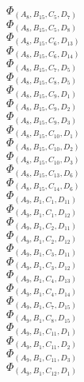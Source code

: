 \documentclass[14pt]{article}
\begin{document}
    $\Phi_{({A}_{8}, {B}_{15}, {C}_{5}, {D}_{7})}$ \\ 
    $\Phi_{({A}_{8}, {B}_{15}, {C}_{5}, {D}_{8})}$ \\ 
    $\Phi_{({A}_{8}, {B}_{15}, {C}_{6}, {D}_{13})}$ \\ 
    $\Phi_{({A}_{8}, {B}_{15}, {C}_{6}, {D}_{14})}$ \\ 
    $\Phi_{({A}_{8}, {B}_{15}, {C}_{7}, {D}_{5})}$ \\ 
    $\Phi_{({A}_{8}, {B}_{15}, {C}_{8}, {D}_{5})}$ \\ 
    $\Phi_{({A}_{8}, {B}_{15}, {C}_{9}, {D}_{1})}$ \\ 
    $\Phi_{({A}_{8}, {B}_{15}, {C}_{9}, {D}_{2})}$ \\ 
    $\Phi_{({A}_{8}, {B}_{15}, {C}_{9}, {D}_{3})}$ \\ 
    $\Phi_{({A}_{8}, {B}_{15}, {C}_{10}, {D}_{1})}$ \\ 
    $\Phi_{({A}_{8}, {B}_{15}, {C}_{10}, {D}_{2})}$ \\ 
    $\Phi_{({A}_{8}, {B}_{15}, {C}_{10}, {D}_{3})}$ \\ 
    $\Phi_{({A}_{8}, {B}_{15}, {C}_{13}, {D}_{6})}$ \\ 
    $\Phi_{({A}_{8}, {B}_{15}, {C}_{14}, {D}_{6})}$ \\ 
    $\Phi_{({A}_{9}, {B}_{1}, {C}_{1}, {D}_{11})}$ \\ 
    $\Phi_{({A}_{9}, {B}_{1}, {C}_{1}, {D}_{12})}$ \\ 
    $\Phi_{({A}_{9}, {B}_{1}, {C}_{2}, {D}_{11})}$ \\ 
    $\Phi_{({A}_{9}, {B}_{1}, {C}_{2}, {D}_{12})}$ \\ 
    $\Phi_{({A}_{9}, {B}_{1}, {C}_{3}, {D}_{11})}$ \\ 
    $\Phi_{({A}_{9}, {B}_{1}, {C}_{3}, {D}_{12})}$ \\ 
    $\Phi_{({A}_{9}, {B}_{1}, {C}_{4}, {D}_{13})}$ \\ 
    $\Phi_{({A}_{9}, {B}_{1}, {C}_{4}, {D}_{14})}$ \\ 
    $\Phi_{({A}_{9}, {B}_{1}, {C}_{7}, {D}_{15})}$ \\ 
    $\Phi_{({A}_{9}, {B}_{1}, {C}_{8}, {D}_{15})}$ \\ 
    $\Phi_{({A}_{9}, {B}_{1}, {C}_{11}, {D}_{1})}$ \\ 
    $\Phi_{({A}_{9}, {B}_{1}, {C}_{11}, {D}_{2})}$ \\ 
    $\Phi_{({A}_{9}, {B}_{1}, {C}_{11}, {D}_{3})}$ \\ 
    $\Phi_{({A}_{9}, {B}_{1}, {C}_{12}, {D}_{1})}$ \\ 
\end{document}
